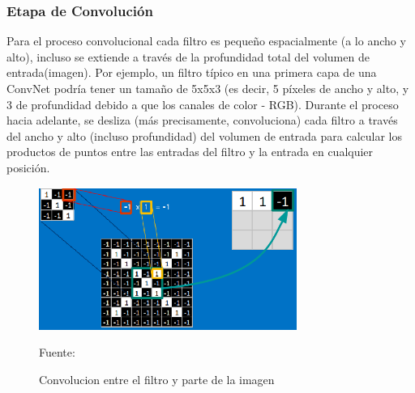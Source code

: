 		\subsubsection {Etapa de Convolución} 
		  
		Para el proceso convolucional cada filtro es pequeño espacialmente (a lo ancho y alto), incluso se extiende a través de la profundidad total del volumen de entrada(imagen). Por ejemplo, un filtro típico en una primera capa de una ConvNet podría tener un tamaño de 5x5x3 (es decir, 5 píxeles de ancho y alto, y 3 de profundidad debido a que los canales de color - RGB). Durante el proceso hacia adelante, se desliza (más precisamente, convoluciona) cada filtro a través del ancho y alto (incluso profundidad) del volumen de entrada para calcular los productos de puntos entre las entradas del filtro y la entrada en cualquier posición.

		\begin{figure}[H]
		\begin{center}
		\includegraphics[width=0.75\textwidth]{images/marcoteorico/generate_filt1}
		\end{center}
		\begin{center}
		\caption{\small{Convolucion entre el filtro y parte de la imagen}}
		\vskip -0.25cm
		{\small{Fuente: \cite{Rohrer}}}
		\end{center}
		\vspace{-1.9em}
		\end{figure}

